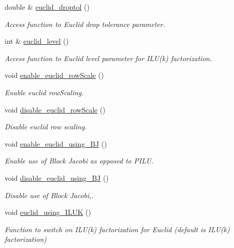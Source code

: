 \begin{DoxyCompactItemize}
double \& \hyperlink{classoomph_1_1HyprePreconditioner_a8b3913c1c8a6b9b6ef07a59f2d597815}{euclid\+\_\+droptol} ()
\begin{DoxyCompactList}\small\item\em Access function to Euclid drop tolerance parameter. \end{DoxyCompactList}\item 
int \& \hyperlink{classoomph_1_1HyprePreconditioner_a6479953e74f0796384f456d7f9787fc5}{euclid\+\_\+level} ()
\begin{DoxyCompactList}\small\item\em Access function to Euclid level parameter for I\+L\+U(k) factorization. \end{DoxyCompactList}\item 
void \hyperlink{classoomph_1_1HyprePreconditioner_a5fb9201982dc22f9a07b32f68963c603}{enable\+\_\+euclid\+\_\+row\+Scale} ()
\begin{DoxyCompactList}\small\item\em Enable euclid row\+Scaling. \end{DoxyCompactList}\item 
void \hyperlink{classoomph_1_1HyprePreconditioner_a96f90cbfd3e92251707872391c3d66ab}{disable\+\_\+euclid\+\_\+row\+Scale} ()
\begin{DoxyCompactList}\small\item\em Disable euclid row scaling. \end{DoxyCompactList}\item 
void \hyperlink{classoomph_1_1HyprePreconditioner_a722f36d087901fd11b5055f7f3b619b3}{enable\+\_\+euclid\+\_\+using\+\_\+\+BJ} ()
\begin{DoxyCompactList}\small\item\em Enable use of Block Jacobi as opposed to P\+I\+LU. \end{DoxyCompactList}\item 
void \hyperlink{classoomph_1_1HyprePreconditioner_a2165ef8d97b1e267d0555f877a3da342}{disable\+\_\+euclid\+\_\+using\+\_\+\+BJ} ()
\begin{DoxyCompactList}\small\item\em Disable use of Block Jacobi,. \end{DoxyCompactList}\item 
void \hyperlink{classoomph_1_1HyprePreconditioner_a635c84d0bdf407eb532e09f9ebe38d9f}{euclid\+\_\+using\+\_\+\+I\+L\+UK} ()
\begin{DoxyCompactList}\small\item\em Function to switch on I\+L\+U(k) factorization for Euclid (default is I\+L\+U(k) factorization) \end{DoxyCompactList}\item 

\end{DoxyCompactItemize}
